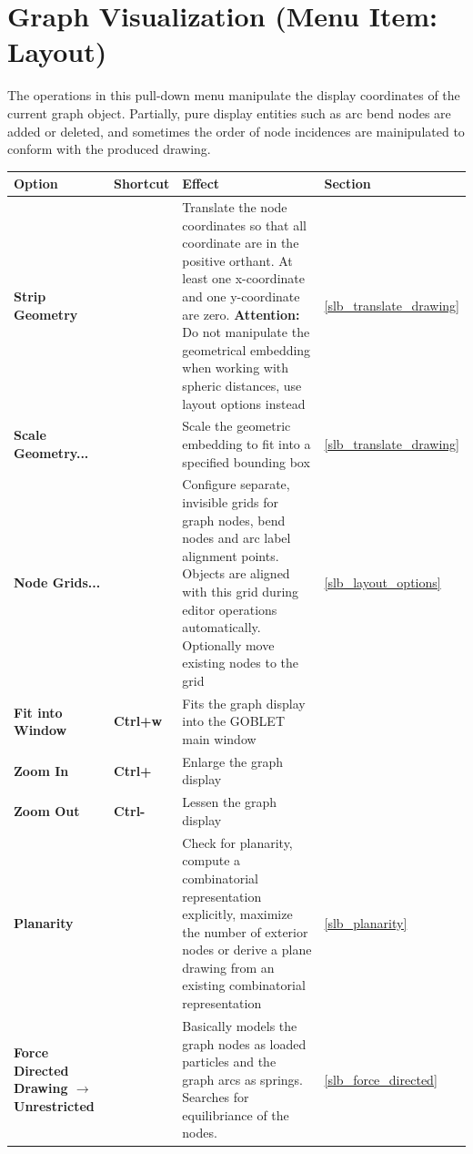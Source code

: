 \documentclass[a4paper,11pt,twoside]{book}
\begin{document}
\vfill
\bigskip
\section{Graph Visualization (Menu Item: Layout)}

The operations in this pull-down menu manipulate the display coordinates of
the current graph object. Partially, pure display entities such as arc
bend nodes are added or deleted, and sometimes the order of node incidences
are mainipulated to conform with the produced drawing.

\bigskip
\noindent
\begin{tabular}{p{4.7cm}|p{2cm}|p{16.3cm}|p{1.5cm}} 
\large\bf Option & \large\bf Shortcut & \large\bf Effect & \large\bf Section \\
[1mm] \hline \hline
\bf Strip Geometry &\bf &
    Translate the node coordinates so that all coordinate are in the positive
    orthant. At least one x-coordinate and one y-coordinate are zero.
    {\bf Attention:} Do not manipulate the geometrical embedding when working
    with spheric distances, use layout options instead &
    \ref{slb_translate_drawing} \\ \hline
\bf Scale Geometry... &\bf &
    Scale the geometric embedding to fit into a specified bounding box &
    \ref{slb_translate_drawing} \\ \hline
\bf Node Grids... &\bf &
    Configure separate, invisible grids for graph nodes, bend nodes and arc
    label alignment points. Objects are aligned with this grid during editor
    operations automatically. Optionally move existing nodes to the grid &
    \ref{slb_layout_options} \\ \hline
\bf Fit into Window & \bf Ctrl+w &
    Fits the graph display into the GOBLET main window \\ \hline
\bf Zoom In &\bf Ctrl+ &
    Enlarge the graph display \\ \hline
\bf Zoom Out &\bf Ctrl- &
    Lessen the graph display \\ \hline
\bf Planarity &\bf &
    Check for planarity, compute a combinatorial representation explicitly,
    maximize the number of exterior nodes or derive a plane drawing
    from an existing combinatorial representation &
    \ref{slb_planarity} \\ \hline
\bf Force Directed Drawing $\rightarrow$ Unrestricted &\bf &
    Basically models the graph nodes as loaded particles and the graph arcs as
    springs. Searches for equilibriance of the nodes.  &
    \ref{slb_force_directed} \\ \hline

\end{tabular}
\end{document}
